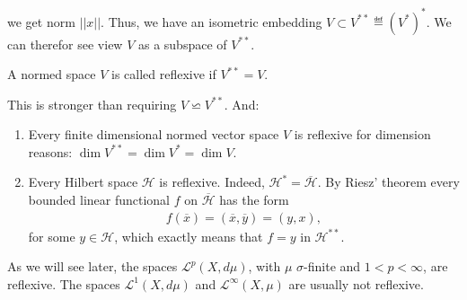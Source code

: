we get norm \(||x||\). Thus, we have an isometric embedding \(V\subset V^{**}\eqdef (V^*)^*\). We can therefor see view \(V\) as a subspace
of \(V^{**}\).
\begin{definition}
    A normed space \(V\) is called reflexive if \(V^{**}=V\).
\end{definition}
\begin{remark}
    This is stronger than requiring \(V\backsimeq V^{**}\). And:
    \begin{enumerate}[label=(\roman*)]
    \item Every finite dimensional normed vector space \(V\) is reflexive for dimension reasons: \(\dim V^{**} = \dim V^*=\dim V\).
    \item Every Hilbert space \(\mathcal{H}\) is reflexive. Indeed, \(\mathcal{H}^*=\overline{\mathcal{H}}\). By Riesz' theorem every bounded linear 
    functional \(f\) on \(\overline{\mathcal{H}}\) has the form
    \begin{align*}
        f(\overline{x}) = (\overline{x}, \overline{y}) = (y,x),
    \end{align*}
    for some \(y\in\mathcal{H}\), which exactly means that \(f=y\) in \(\mathcal{H}^{**}\).
    \end{enumerate}
\end{remark}
As we will see later, the spaces \(\mathcal{L}^{p}(X,d\mu)\), with \(\mu\) \(\sigma\)-finite and \(1<p<\infty\), are reflexive. The spaces
\(\mathcal{L}^{1}(X, d\mu)\) and \(\mathcal{L}^{\infty}(X,\mu)\) are usually not reflexive.

